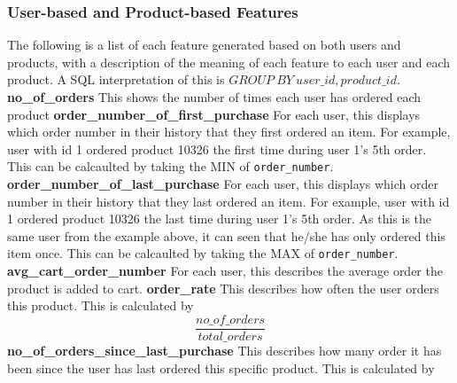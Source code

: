 \documentclass[12pt]{article}
\begin{document}
\subsubsection{User-based and Product-based Features} \label{user_product_features}
The following is a list of each feature generated based on both users and products, with a description of the meaning of each feature to each user and each product. A SQL interpretation of this is $GROUP\ BY\ user\_id, product\_id$.
\newline\newline
{\textbf{no\_of\_orders}}
\newline
This shows the number of times each user has ordered each product
\newline\newline
{\textbf{order\_number\_of\_first\_purchase}}
\newline
For each user, this displays which order number in their history that they first ordered an item. For example, user with id 1 ordered product 10326 the first time during user 1's 5th order. This can be calcaulted by taking the MIN of \texttt{order\_number}.
\newline\newline
{\textbf{order\_number\_of\_last\_purchase}}
\newline
For each user, this displays which order number in their history that they last ordered an item. For example, user with id 1 ordered product 10326 the last time during user 1's 5th order. As this is the same user from the example above, it can seen that he/she has only ordered this item once. This can be calcaulted by taking the MAX of \texttt{order\_number}.
\newline\newline
{\textbf{avg\_cart\_order\_number}}
\newline
For each user, this describes the average order the product is added to cart.
\newline\newline
{\textbf{order\_rate}}
\newline
This describes how often the user orders this product. This is calculated by
\begin{equation}
    \frac
    {no\_of\_orders}
    {total\_orders}
\end{equation}
\newline\newline
{\textbf{no\_of\_orders\_since\_last\_purchase}}
\newline
This describes how many order it has been since the user has last ordered this specific product. This is calculated by
\end{document}
